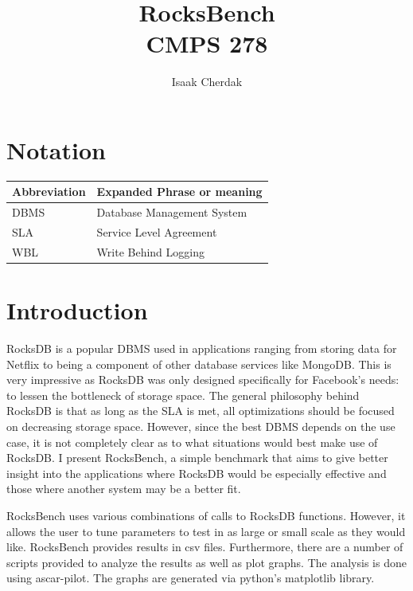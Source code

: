 \documentclass[twocolumn,11pt]{article}
\title{RocksBench\\CMPS 278}
\author{Isaak Cherdak}
\begin{document}
\maketitle

\pagebreak

\section*{Notation}

\begin{center}
  \begin{tabular}{ | l | l | }
    \hline
    Abbreviation & Expanded Phrase or meaning\\ \hline \hline
    DBMS & Database Management System\\ \hline
    SLA & Service Level Agreement\\ \hline
    WBL\cite{Arulraj:2016:WL:3025111.3025116} & Write Behind Logging \\ \hline
  \end{tabular}
\end{center}

\section{Introduction}
\label{sec:overview}

RocksDB\cite{rocksdb} is a popular DBMS used in applications ranging from
storing data for Netflix to being a component of other database services like
MongoDB. This is very impressive as RocksDB was only designed specifically for
Facebook's needs: to lessen the bottleneck of storage space. The general
philosophy behind RocksDB is that as long as the SLA is met, all optimizations
should be focused on decreasing storage space. However, since the best DBMS
depends on the use case\cite{278:lecture}, it is not completely clear as to what
situations would best make use of RocksDB. I present RocksBench, a simple
benchmark that aims to give better insight into the applications where RocksDB
would be especially effective and those where another system may be a better
fit.

RocksBench uses various combinations of calls to RocksDB functions. However, it
allows the user to tune parameters to test in as large or small scale as they
would like. RocksBench provides results in csv files. Furthermore, there are a
number of scripts provided to analyze the results as well as plot graphs. The
analysis is done using ascar-pilot\cite{li:pilot}. The graphs are generated via
python's matplotlib library.
\end{document}
